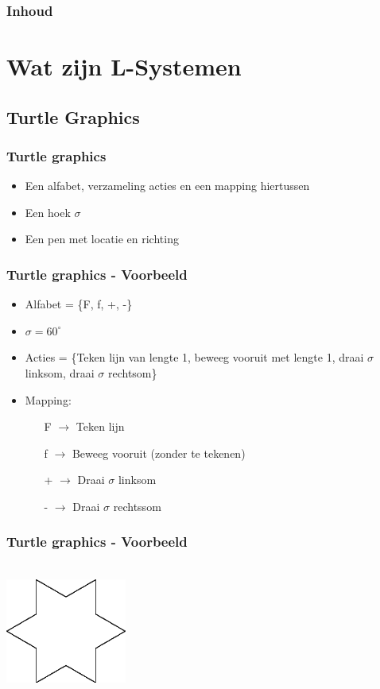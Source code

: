 \documentclass[ignorenonframetext,compress]{beamer}
\begin{document}
\begin{frame}[fragile]
	\frametitle{Inhoud}
\tableofcontents
\end{frame}

\section{Wat zijn L-Systemen}
\subsection{Turtle Graphics}

\begin{frame}[fragile]
	\frametitle{Turtle graphics}
\begin{itemize}
\item Een alfabet, verzameling acties en een mapping hiertussen
\item Een hoek $\sigma$
\item Een pen met locatie en richting
\end{itemize}
\end{frame}

\begin{frame}[fragile]
	\frametitle{Turtle graphics - Voorbeeld}
\begin{itemize}
\item Alfabet = \{F, f, +, -\}
\item $\sigma = 60^{\circ}$
\item Acties = \{Teken lijn van lengte 1, beweeg vooruit met lengte 1, draai $\sigma$ linksom, draai $\sigma$ rechtsom\}
\pause
\item Mapping: \begin{itemize}
	\item[F] $\rightarrow$ Teken lijn
	\item[f] $\rightarrow$ Beweeg vooruit (zonder te tekenen)
	\item[+] $\rightarrow$ Draai $\sigma$ linksom
	\item[-] $\rightarrow$ Draai $\sigma$ rechtssom	
	\end{itemize}
\end{itemize}
\end{frame}

\begin{frame}[fragile]
	\frametitle{Turtle graphics - Voorbeeld}
\begin{center}
 \\
\includegraphics[]{koch2.png}
\end{center}
\end{frame}
\end{document}
